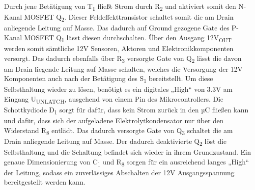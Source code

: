 Durch jene Betätigung von T\textsubscript{1} fließt Strom durch R\textsubscript{2} und aktiviert somit den N-Kanal MOSFET Q\textsubscript{2}.
Dieser Feldeffekttransistor schaltet somit die am Drain anliegende Leitung auf Masse.
Das dadurch auf Ground gezogene Gate des P-Kanal MOSFET Q\textsubscript{1} lässt diesen durchschalten.
Über den Ausgang 12V\textsubscript{OUT} werden somit sämtliche 12V Sensoren, Aktoren und Elektronikkomponenten versorgt.
Das dadurch ebenfalls über R\textsubscript{3} versorgte Gate von Q\textsubscript{2} lässt die davon am Drain liegende Leitung auf Masse schalten,
welches die Versorgung der 12V Komponenten auch nach der Betätigung des S\textsubscript{1} bereitstellt.
Um diese Selbsthaltung wieder zu lösen, benötigt es ein digitales „High“ von 3.3V am Eingang U\textsubscript{UNLATCH}, ausgehend von einem Pin des Mikrocontrollers.
Die Schottkydiode D\textsubscript{1} sorgt für dafür, dass kein Strom zurück in den µC fließen kann und dafür,
dass sich der aufgeladene Elektrolytkondensator nur über den Widerstand R\textsubscript{8} entlädt.
Das dadurch versorgte Gate von Q\textsubscript{3} schaltet die am Drain anliegende Leitung auf Masse.
Der dadurch deaktivierte Q\textsubscript{2} löst die Selbsthaltung und die Schaltung befindet sich wieder in ihrem Grundzustand.
Ein genaue Dimensionierung von C\textsubscript{1} und R\textsubscript{8} sorgen für ein ausreichend langes „High“ der Leitung,
sodass ein zuverlässiges Abschalten der 12V Ausgangsspannung bereitgestellt werden kann. \\

